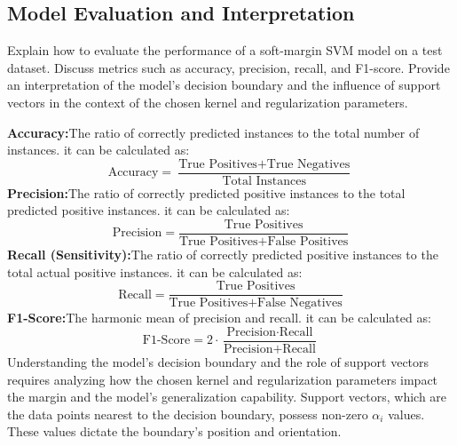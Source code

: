 \subsection{Model Evaluation and Interpretation}
Explain how to evaluate the performance of a soft-margin SVM model on a test dataset. Discuss metrics such as accuracy, precision, recall, and F1-score. Provide an interpretation of the model's decision boundary and the influence of support vectors in the context of the chosen kernel and regularization parameters.
\begin{qsolve}
    \begin{qsolve}[]
        \textbf{Accuracy:}The ratio of correctly predicted instances to the total number of instances. it can be calculated as:
            \begin{equation*}
                \text{Accuracy} = \frac{\text{True Positives} + \text{True Negatives}}{\text{Total Instances}}
            \end{equation*}
        \textbf{Precision:}The ratio of correctly predicted positive instances to the total predicted positive instances. it can be calculated as:
            \begin{equation*}
                \text{Precision} = \frac{\text{True Positives}}{\text{True Positives} + \text{False Positives}}
            \end{equation*}
        \textbf{Recall (Sensitivity):}The ratio of correctly predicted positive instances to the total actual positive instances. it can be calculated as:
            \begin{equation*}
                \text{Recall} = \frac{\text{True Positives}}{\text{True Positives} + \text{False Negatives}}
            \end{equation*}
        \textbf{F1-Score:}The harmonic mean of precision and recall. it can be calculated as:
            \begin{equation*}
                \text{F1-Score} = 2 \cdot \frac{\text{Precision} \cdot \text{Recall}}{\text{Precision} + \text{Recall}}
            \end{equation*}
        Understanding the model's decision boundary and the role of support vectors requires analyzing how the chosen kernel and regularization parameters impact the margin and the model's generalization capability. Support vectors, which are the data points nearest to the decision boundary, possess non-zero $\alpha_i$ values. These values dictate the boundary's position and orientation.
    \end{qsolve}
\end{qsolve}